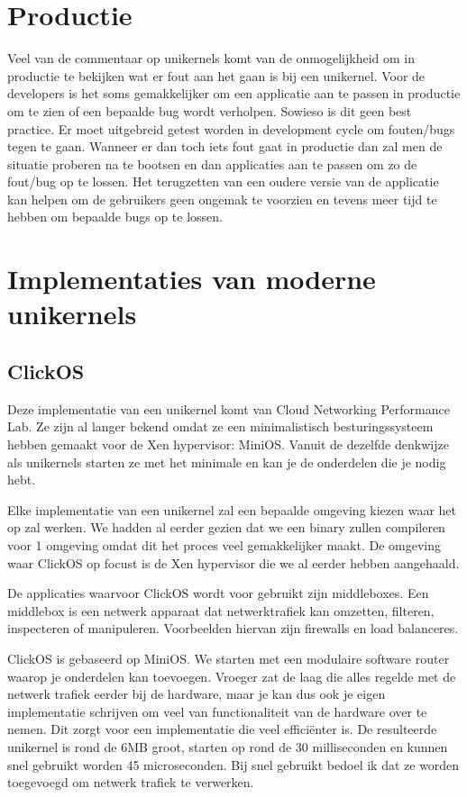 \documentclass[pdftex,a4paper,12pt,twoside]{report}
\begin{document}
\section{Productie}

Veel van de commentaar op unikernels komt van de onmogelijkheid om in productie te bekijken wat er fout aan het gaan is bij een unikernel. Voor de developers is het soms gemakkelijker om een applicatie aan te passen in productie om te zien of een bepaalde bug wordt verholpen. Sowieso is dit geen best practice. Er moet uitgebreid getest worden in development cycle om fouten/bugs tegen te gaan. Wanneer er dan toch iets fout gaat in productie dan zal men de situatie proberen na te bootsen en dan applicaties aan te passen om zo de fout/bug op te lossen. Het terugzetten van een oudere versie van de applicatie kan helpen om de gebruikers geen ongemak te voorzien en tevens meer tijd te hebben om bepaalde bugs op te lossen.

\section{Implementaties van moderne unikernels}

\subsection{ClickOS}

Deze implementatie van een unikernel komt van Cloud Networking Performance Lab. Ze zijn al langer bekend omdat ze een minimalistisch besturingssysteem hebben gemaakt voor de Xen hypervisor: MiniOS. Vanuit de dezelfde denkwijze als unikernels starten ze met het minimale en kan je de onderdelen die je nodig hebt.

Elke implementatie van een unikernel zal een bepaalde omgeving kiezen waar het op zal werken. We hadden al eerder gezien dat we een binary zullen compileren voor 1 omgeving omdat dit het proces veel gemakkelijker maakt. De omgeving waar ClickOS op focust is de Xen hypervisor die we al eerder hebben aangehaald.

De applicaties waarvoor ClickOS wordt voor gebruikt zijn middleboxes.  Een middlebox is een netwerk apparaat dat netwerktrafiek kan omzetten, filteren, inspecteren of manipuleren. Voorbeelden hiervan zijn firewalls en load balanceres.

ClickOS is gebaseerd op MiniOS. We starten met een modulaire software router waarop je onderdelen kan toevoegen. Vroeger zat de laag die alles regelde met de netwerk trafiek eerder bij de hardware, maar je kan dus ook je eigen implementatie schrijven om veel van functionaliteit van de hardware over te nemen. Dit zorgt voor een implementatie die veel efficiënter is. De resulteerde unikernel is rond de 6MB groot, starten op rond de 30 milliseconden en kunnen snel gebruikt worden 45 microseconden. Bij snel gebruikt bedoel ik dat ze worden toegevoegd om netwerk trafiek te verwerken.
\end{document}
